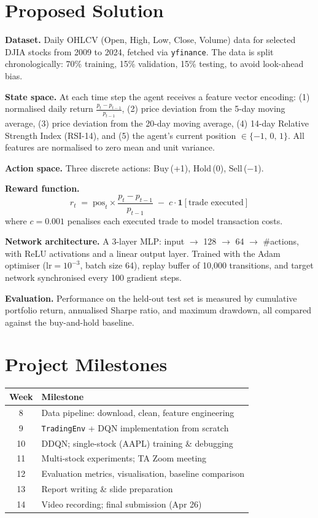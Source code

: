 \documentclass[10pt,twocolumn]{article}
\begin{document}
\section{Proposed Solution}

\textbf{Dataset.}
Daily OHLCV (Open, High, Low, Close, Volume) data for selected DJIA
stocks from 2009 to 2024, fetched via \texttt{yfinance}.
The data is split chronologically: 70\% training, 15\% validation,
15\% testing, to avoid look-ahead bias.

\textbf{State space.}
At each time step the agent receives a feature vector encoding:
(1) normalised daily return $\frac{p_t - p_{t-1}}{p_{t-1}}$,
(2) price deviation from the 5-day moving average,
(3) price deviation from the 20-day moving average,
(4) 14-day Relative Strength Index (RSI-14), and
(5) the agent's current position $\in\{-1,\,0,\,1\}$.
All features are normalised to zero mean and unit variance.

\textbf{Action space.}
Three discrete actions: Buy\,(+1), Hold\,(0), Sell\,($-1$).

\textbf{Reward function.}
\[
  r_t \;=\; \mathrm{pos}_t \times \frac{p_t - p_{t-1}}{p_{t-1}}
           \;-\; c\cdot\mathbf{1}[\text{trade executed}]
\]
where $c = 0.001$ penalises each executed trade to model transaction costs.

\textbf{Network architecture.}
A 3-layer MLP: input $\to$ 128 $\to$ 64 $\to$ \#actions, with ReLU
activations and a linear output layer. Trained with the Adam optimiser
($\mathrm{lr} = 10^{-3}$, batch size 64), replay buffer of 10{,}000
transitions, and target network synchronised every 100 gradient steps.

\textbf{Evaluation.}
Performance on the held-out test set is measured by cumulative portfolio
return, annualised Sharpe ratio, and maximum drawdown, all compared
against the buy-and-hold baseline.

\section{Project Milestones}

\begin{center}
\small
\begin{tabular}{@{}cl@{}}
\toprule
\textbf{Week} & \textbf{Milestone} \\
\midrule
8  & Data pipeline: download, clean, feature engineering \\
9  & \texttt{TradingEnv} + DQN implementation from scratch \\
10 & DDQN; single-stock (AAPL) training \& debugging \\
11 & Multi-stock experiments; TA Zoom meeting \\
12 & Evaluation metrics, visualisation, baseline comparison \\
13 & Report writing \& slide preparation \\
14 & Video recording; final submission (Apr 26) \\
\bottomrule
\end{tabular}
\end{center}
\end{document}
